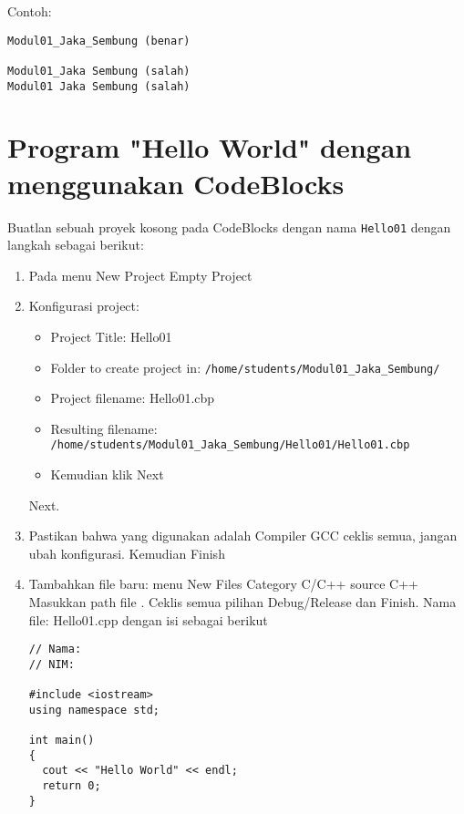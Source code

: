 \documentclass[a4paper,11pt]{extarticle}
\begin{document}
Contoh:
\begin{verbatim}
Modul01_Jaka_Sembung (benar)

Modul01_Jaka Sembung (salah)
Modul01 Jaka Sembung (salah)
\end{verbatim}

\section{Program "Hello World" dengan menggunakan CodeBlocks}

Buatlan sebuah proyek kosong pada CodeBlocks dengan nama \texttt{Hello01}
dengan langkah sebagai berikut:
\begin{enumerate}
\item Pada menu \textsf{New} \textrightarrow \textsf{Project}
      \textrightarrow \textsf{Empty Project}
%
\item Konfigurasi project:
  \begin{itemize}
  \item \textsf{Project Title}: Hello01
  \item \textsf{Folder to create project in}: \texttt{/home/students/Modul01\_Jaka\_Sembung/}
  \item \textsf{Project filename}: Hello01.cbp
  \item \textsf{Resulting filename}: \\
  \texttt{/home/students/Modul01\_Jaka\_Sembung/Hello01/Hello01.cbp}
  \item Kemudian klik \textsf{Next}
  \end{itemize}
  \textsf{Next}.
%
\item Pastikan bahwa yang digunakan adalah \textsf{Compiler GCC}
ceklis semua, jangan ubah konfigurasi. Kemudian \textsf{Finish}
%
\item Tambahkan file baru: menu 
      \textsf{New} \textrightarrow \textsf{Files} \textrightarrow
      \textsf{Category C/C++ source}
      \textrightarrow \textsf{C++} \textrightarrow
      Masukkan path file \textrightarrow
      .
      Ceklis semua pilihan \textsf{Debug/Release} dan \textsf{Finish}.
      Nama file: \textsf{Hello01.cpp} dengan isi sebagai berikut
%
\begin{verbatim}
// Nama:
// NIM:

#include <iostream>
using namespace std;

int main()
{
  cout << "Hello World" << endl;
  return 0;
}
\end{verbatim}
%
\end{enumerate}
\end{document}
